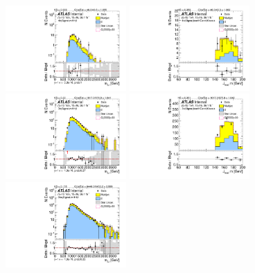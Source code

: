 \begin{figure}[htb!]
\begin{center}
\includegraphics[width=0.41\textwidth,angle=-90]{figures/boosted/TT/Moriond_TT_FourTag_Signal_mHH_l_1.pdf}
\includegraphics[width=0.41\textwidth,angle=-90]{figures/boosted/TT/Moriond_TT_FourTag_Signal_leadHCand_Mass_s.pdf}\\
\includegraphics[width=0.41\textwidth,angle=-90]{figures/boosted/TT/Moriond_TT_ThreeTag_Signal_mHH_l_1.pdf}
\includegraphics[width=0.41\textwidth,angle=-90]{figures/boosted/TT/Moriond_TT_ThreeTag_Signal_leadHCand_Mass_s.pdf}\\
\includegraphics[width=0.41\textwidth,angle=-90]{figures/boosted/TT/Moriond_TT_TwoTag_split_Signal_mHH_l_1.pdf}

\end{center}
\end{figure}

